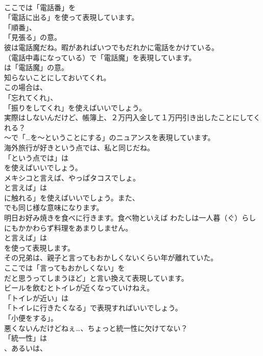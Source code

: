 \documentclass[8pt]{extreport}
\begin{document}
\begin{CJK}{UTF8}{min}
\\	ここでは「電話番」を
\\	「電話に出る」を使って表現しています。
\\	「順番」、
\\	「見張る」の意。	
\\	彼は電話魔だね。暇があればいつでもだれかに電話をかけている。 
\\	（電話中毒になっている）で「電話魔」を表現しています。
\\	は「電話魔」の意。	
\\	知らないことにしておいてくれ。 
\\	この場合は、
\\	「忘れてくれ」、
\\	「振りをしてくれ」を使えばいいでしょう。	
\\	実際はしないんだけど、帳簿上、２万円入金して１万円引き出したことにしてくれる？ 
\\	～で「…を～ということにする」のニュアンスを表現しています。	
\\	海外旅行が好きという点では、私と同じだね。 
\\	「という点では」は
\\	を使えばいいでしょう。	
\\	メキシコと言えば、やっぱタコスでしょ。 
\\	と言えば」は
\\	に触れる」を使えばいいでしょう。また、
\\	でも同じ様な意味になります。	
\\	明日お好み焼きを食べに行きます。食べ物といえば わたしは一人暮（ぐ）らしにもかかわらず料理をあまりしません。 
\\	と言えば」は
\\	を使って表現します。	
\\	その兄弟は、親子と言ってもおかしくないくらい年が離れていた。 
\\	ここでは「言ってもおかしくない」を
\\	だと思うってしまうほど」と言い換えて表現しています。	
\\	ビールを飲むとトイレが近くなっていけねえ。 
\\	「トイレが近い」は
\\	「トイレに行きたくなる」で表現すればいいでしょう。
\\	「小便をする」。	
\\	悪くないんだけどねぇ…、ちょっと統一性に欠けてない？ 
\\	「統一性」は 
\\	、あるいは、

\end{CJK}
\end{document}
